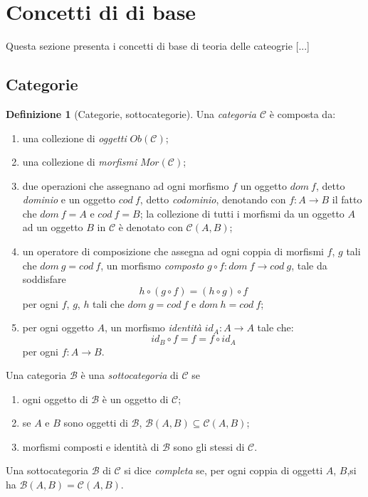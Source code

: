 \documentclass{article}
\theoremstyle{plain}
\theoremstyle{definition}
\newtheorem{definition}[theorem]{Definizione}
\newcommand{\id}[1]{id_{#1}}
\begin{document}
\section{Concetti di di base}

Questa sezione presenta i concetti di base di teoria delle cateogrie [...] 

\subsection{Categorie}

	\begin{definition}[Categorie, sottocategorie]
		Una \emph{categoria $\mathcal{C}$} è composta da:
		\begin{enumerate}
			\item una collezione di \emph{oggetti} $Ob(\mathcal{C})$;
			\item una collezione di \emph{morfismi} $Mor(\mathcal{C})$;
			\item due operazioni che assegnano ad ogni morfismo $f$ un 
				oggetto $dom\ f$, detto \emph{dominio} e un oggetto $cod\ f$, detto \emph{codominio}, 
				denotando con $f: A \rightarrow B$ il fatto che $dom\ f = A \text{ e } cod\ f = B$; 
				la collezione di tutti i morfismi da un oggetto $A$ ad un oggetto $B$ in $\mathcal{C}$ è 
				denotato con $\mathcal{C}(A, B)$;
			\item un operatore di composizione che assegna ad ogni coppia di morfismi $f$, $g$ tali che 
				$dom\ g = cod\ f$, un morfismo \emph{composto} $g \circ f: dom\ f \rightarrow cod\ g$, 
				tale da soddisfare
				\[
					h \circ (g \circ f) = (h \circ g) \circ f
				\]
				per ogni $f$, $g$, $h$ tali che $dom\ g = cod\ f \text{ e } dom\ h = cod\ f$;
			\item per ogni oggetto $A$, un morfismo \emph{identità} $\id{A}: A \rightarrow A$ tale che:
				\[
					\id{B} \circ f = f = f \circ \id{A}
				\]
				per ogni $f: A \rightarrow B$.
		\end{enumerate}

		Una categoria $\mathcal{B}$ è una \emph{sottocategoria} di $\mathcal{C}$ se
		\begin{enumerate}
			\item ogni oggetto di $\mathcal{B}$ è un oggetto di $\mathcal{C}$;
			\item se $A$ e $B$ sono oggetti di $\mathcal{B}$, $\mathcal{B}(A, B) \subseteq \mathcal{C}(A, B)$;
			\item morfismi composti e identità di $\mathcal{B}$ sono gli stessi di $\mathcal{C}$.
		\end{enumerate}
		
		Una sottocategoria $\mathcal{B}$ di $\mathcal{C}$ si dice \emph{completa} se, 
		per ogni coppia di oggetti $A$, $B$,si ha
		$\mathcal{B}(A, B) = \mathcal{C}(A, B)$.

	\end{definition}
\end{document}
